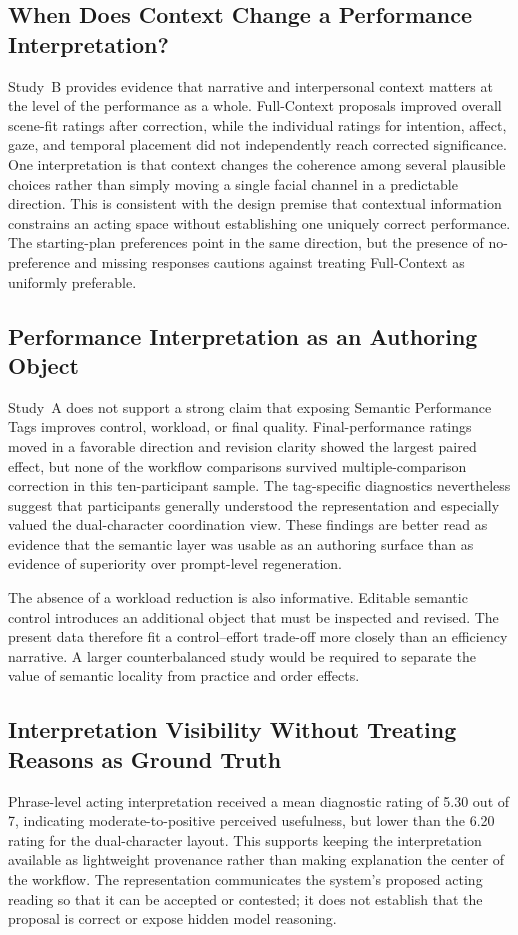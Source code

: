 \subsection{When Does Context Change a Performance Interpretation?}
Study~B provides evidence that narrative and interpersonal context matters at
the level of the performance as a whole. Full-Context proposals improved
overall scene-fit ratings after correction, while the individual ratings for
intention, affect, gaze, and temporal placement did not independently reach
corrected significance. One interpretation is that context changes the
coherence among several plausible choices rather than simply moving a single
facial channel in a predictable direction. This is consistent with the design
premise that contextual information constrains an acting space without
establishing one uniquely correct performance. The starting-plan preferences
point in the same direction, but the presence of no-preference and missing
responses cautions against treating Full-Context as uniformly preferable.

\subsection{Performance Interpretation as an Authoring Object}
Study~A does not support a strong claim that exposing Semantic Performance Tags
improves control, workload, or final quality. Final-performance ratings moved
in a favorable direction and revision clarity showed the largest paired effect,
but none of the workflow comparisons survived multiple-comparison correction
in this ten-participant sample. The tag-specific diagnostics nevertheless
suggest that participants generally understood the representation and
especially valued the dual-character coordination view. These findings are
better read as evidence that the semantic layer was usable as an authoring
surface than as evidence of superiority over prompt-level regeneration.

The absence of a workload reduction is also informative. Editable semantic
control introduces an additional object that must be inspected and revised.
The present data therefore fit a control--effort trade-off more closely than an
efficiency narrative. A larger counterbalanced study would be required to
separate the value of semantic locality from practice and order effects.

\subsection{Interpretation Visibility Without Treating Reasons as Ground Truth}
Phrase-level acting interpretation received a mean diagnostic rating of 5.30
out of 7, indicating moderate-to-positive perceived usefulness, but lower than
the 6.20 rating for the dual-character layout. This supports keeping the
interpretation available as lightweight provenance rather than making
explanation the center of the workflow. The representation communicates the
system's proposed acting reading so that it can be accepted or contested; it
does not establish that the proposal is correct or expose hidden model
reasoning.

